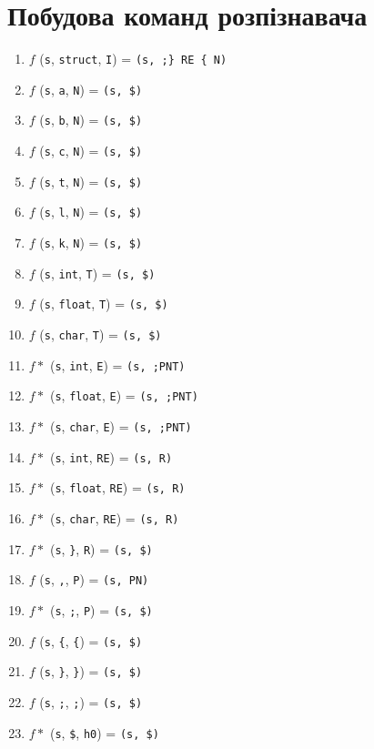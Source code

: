 \newpage
\section{Побудова команд розпізнавача}
\begin{enumerate}
    \item  $f$  (\verb|s|,  \verb|struct|,  \verb|I|)       = \verb|(s, ;} RE { N)|\
    \item  $f$  (\verb|s|,  \verb|a|,       \verb|N|)       = \verb|(s, $)|\
    \item  $f$  (\verb|s|,  \verb|b|,       \verb|N|)       = \verb|(s, $)|\
    \item  $f$  (\verb|s|,  \verb|c|,       \verb|N|)       = \verb|(s, $)|\
    \item  $f$  (\verb|s|,  \verb|t|,       \verb|N|)       = \verb|(s, $)|\
    \item  $f$  (\verb|s|,  \verb|l|,       \verb|N|)       = \verb|(s, $)|\
    \item  $f$  (\verb|s|,  \verb|k|,       \verb|N|)       = \verb|(s, $)|\
    \item  $f$  (\verb|s|,  \verb|int|,     \verb|T|)       = \verb|(s, $)|\
    \item  $f$  (\verb|s|,  \verb|float|,   \verb|T|)       = \verb|(s, $)|\
    \item  $f$  (\verb|s|,  \verb|char|,    \verb|T|)       = \verb|(s, $)|\
    \item  $f*$ (\verb|s|,  \verb|int|,     \verb|E|)       = \verb|(s, ;PNT)|\
    \item  $f*$ (\verb|s|,  \verb|float|,   \verb|E|)       = \verb|(s, ;PNT)|\
    \item  $f*$ (\verb|s|,  \verb|char|,    \verb|E|)       = \verb|(s, ;PNT)|\
    \item  $f*$ (\verb|s|,  \verb|int|,     \verb|RE|)      = \verb|(s, R)|\
    \item  $f*$ (\verb|s|,  \verb|float|,   \verb|RE|)      = \verb|(s, R)|\
    \item  $f*$ (\verb|s|,  \verb|char|,    \verb|RE|)      = \verb|(s, R)|\
    \item  $f*$ (\verb|s|,  \verb|}|,       \verb|R|)       = \verb|(s, $)|\
    \item  $f$  (\verb|s|,  \verb|,|,       \verb|P|)       = \verb|(s, PN)|\
    \item  $f*$ (\verb|s|,  \verb|;|,       \verb|P|)       = \verb|(s, $)|\

    \item  $f$  (\verb|s|,  \verb|{|,       \verb|{|)       = \verb|(s, $)|\
    \item  $f$  (\verb|s|,  \verb|}|,       \verb|}|)       = \verb|(s, $)|\
    \item  $f$  (\verb|s|,  \verb|;|,       \verb|;|)       = \verb|(s, $)|\
    \item  $f*$ (\verb|s|,  \verb|$|,       \verb|h0|)      = \verb|(s, $)|\

\end{enumerate}

